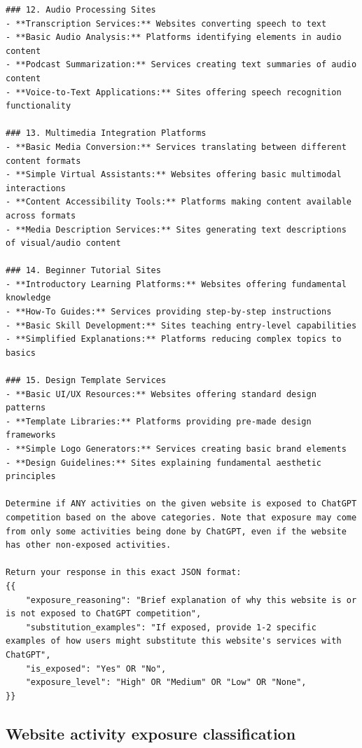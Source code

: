 \documentclass[12pt]{article}
\begin{document}
{\begin{verbatim}
### 12. Audio Processing Sites
- **Transcription Services:** Websites converting speech to text
- **Basic Audio Analysis:** Platforms identifying elements in audio content
- **Podcast Summarization:** Services creating text summaries of audio content
- **Voice-to-Text Applications:** Sites offering speech recognition functionality

### 13. Multimedia Integration Platforms
- **Basic Media Conversion:** Services translating between different content formats
- **Simple Virtual Assistants:** Websites offering basic multimodal interactions
- **Content Accessibility Tools:** Platforms making content available across formats
- **Media Description Services:** Sites generating text descriptions of visual/audio content

### 14. Beginner Tutorial Sites
- **Introductory Learning Platforms:** Websites offering fundamental knowledge
- **How-To Guides:** Services providing step-by-step instructions
- **Basic Skill Development:** Sites teaching entry-level capabilities
- **Simplified Explanations:** Platforms reducing complex topics to basics

### 15. Design Template Services
- **Basic UI/UX Resources:** Websites offering standard design patterns
- **Template Libraries:** Platforms providing pre-made design frameworks
- **Simple Logo Generators:** Services creating basic brand elements
- **Design Guidelines:** Sites explaining fundamental aesthetic principles

Determine if ANY activities on the given website is exposed to ChatGPT competition based on the above categories. Note that exposure may come from only some activities being done by ChatGPT, even if the website has other non-exposed activities.

Return your response in this exact JSON format:
{{
    "exposure_reasoning": "Brief explanation of why this website is or is not exposed to ChatGPT competition",
    "substitution_examples": "If exposed, provide 1-2 specific examples of how users might substitute this website's services with ChatGPT",
    "is_exposed": "Yes" OR "No",
    "exposure_level": "High" OR "Medium" OR "Low" OR "None",
}}
\end{verbatim}

}


\subsection{Website activity exposure classification} \label{sec:exposure_prompt_activity}
\end{document}
